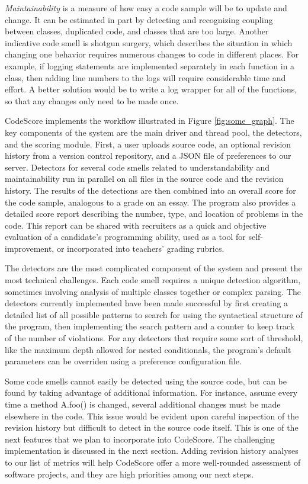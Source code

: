 \documentclass{sig-alternate}
\begin{document}
\emph{Maintainability} is a measure of how easy a code sample will be to update
and change. It can be estimated in part by detecting and recognizing coupling
between classes, duplicated code, and classes that are too large. Another
indicative code smell is shotgun surgery, which describes the situation in which
changing one behavior requires numerous changes to code in different places. For
example, if logging statements are implemented separately in each function in a
class, then adding line numbers to the logs will require considerable time and effort. A
better solution would be to write a log wrapper for all of the functions, so
that any changes only need to be made once. 

CodeScore implements the workflow illustrated in Figure \ref{fig:some_graph}. The
key components of the system are the main driver and thread pool, the detectors,
and the scoring module. First, a user uploads source code, an optional
revision history from a version control repository, and a JSON file of
preferences to our server. Detectors for several code smells related to
understandability and maintainability run in parallel on all files in the source
code and the revision history. The results of the detections are then combined 
into an overall score for the code sample, analogous to a grade on an essay. The program 
also provides a detailed score report describing the number, type, and location of
problems in the code. This report can be shared with recruiters as a quick and objective
evaluation of a candidate's programming ability, used as a tool for
self-improvement, or incorporated into teachers' grading rubrics. 

The detectors are the most complicated component of the system and present the
most technical challenges. Each code smell requires a unique detection
algorithm, sometimes involving analysis of multiple classes together or complex
parsing. The detectors currently implemented have been made successful by first
creating a detailed list of all possible patterns to search for using the
syntactical structure of the program, then implementing the search pattern and
a counter to keep track of the number of violations. For any detectors that
require some sort of threshold, like the maximum depth allowed for nested
conditionals, the program's default parameters can be overriden using a
preference configuration file.

Some code smells cannot easily be detected using the source code, but
can be found by taking advantage of additional information. For instance, assume
every time a method A.foo() is changed, several additional changes must be made
elsewhere in the code. This issue would be evident upon careful inspection of the
revision history but difficult to detect in the source code itself. This is one
of the next features that we plan to incorporate into CodeScore. The challenging
implementation is discussed in the next section. Adding revision history analyses
to our list of metrics will help CodeScore offer a more well-rounded assessment of software
projects, and they are high priorities among our next steps.
\end{document}
